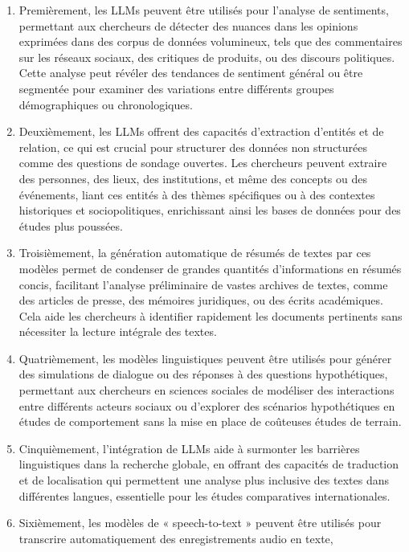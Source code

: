 \documentclass[
  letterpaper,
  DIV=11,
  numbers=noendperiod,
  oneside]{scrreprt}
\begin{document}
\begin{enumerate}
\def\labelenumi{\arabic{enumi}.}
\item
  Premièrement, les LLMs peuvent être utilisés pour l'analyse de
  sentiments, permettant aux chercheurs de détecter des nuances dans les
  opinions exprimées dans des corpus de données volumineux, tels que des
  commentaires sur les réseaux sociaux, des critiques de produits, ou
  des discours politiques. Cette analyse peut révéler des tendances de
  sentiment général ou être segmentée pour examiner des variations entre
  différents groupes démographiques ou chronologiques.
\item
  Deuxièmement, les LLMs offrent des capacités d'extraction d'entités et
  de relation, ce qui est crucial pour structurer des données non
  structurées comme des questions de sondage ouvertes. Les chercheurs
  peuvent extraire des personnes, des lieux, des institutions, et même
  des concepts ou des événements, liant ces entités à des thèmes
  spécifiques ou à des contextes historiques et sociopolitiques,
  enrichissant ainsi les bases de données pour des études plus poussées.
\item
  Troisièmement, la génération automatique de résumés de textes par ces
  modèles permet de condenser de grandes quantités d'informations en
  résumés concis, facilitant l'analyse préliminaire de vastes archives
  de textes, comme des articles de presse, des mémoires juridiques, ou
  des écrits académiques. Cela aide les chercheurs à identifier
  rapidement les documents pertinents sans nécessiter la lecture
  intégrale des textes.
\item
  Quatrièmement, les modèles linguistiques peuvent être utilisés pour
  générer des simulations de dialogue ou des réponses à des questions
  hypothétiques, permettant aux chercheurs en sciences sociales de
  modéliser des interactions entre différents acteurs sociaux ou
  d'explorer des scénarios hypothétiques en études de comportement sans
  la mise en place de coûteuses études de terrain.
\item
  Cinquièmement, l'intégration de LLMs aide à surmonter les barrières
  linguistiques dans la recherche globale, en offrant des capacités de
  traduction et de localisation qui permettent une analyse plus
  inclusive des textes dans différentes langues, essentielle pour les
  études comparatives internationales.
\item
  Sixièmement, les modèles de « speech-to-text » peuvent être utilisés
  pour transcrire automatiquement des enregistrements audio en texte,

\end{enumerate}
\end{document}

